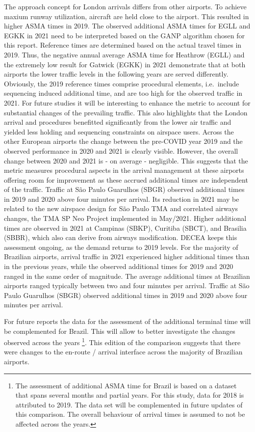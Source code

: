 \documentclass[
  a4paper,
  DIV=11,
  numbers=noendperiod]{scrreprt}
\begin{document}
The approach concept for London arrivals differs from other airports. To
achieve maxium runway utilization, aircraft are held close to the
airport. This resulted in higher ASMA times in 2019. The observed
additional ASMA times for EGLL and EGKK in 2021 need to be interpreted
based on the GANP algorithm chosen for this report. Reference times are
determined based on the actual travel times in 2019. Thus, the negative
annual average ASMA time for Heathrow (EGLL) and the extremely low
result for Gatwick (EGKK) in 2021 demonstrate that at both airports the
lower traffic levels in the following years are served differently.
Obviously, the 2019 reference times comprise procedural elements,
i.e.~include sequencing induced additional time, and are too high for
the observed traffic in 2021. For future studies it will be interesting
to enhance the metric to account for substantial changes of the
prevailing traffic. This also highlights that the London arrival and
procedures benefitted significantly from the lower air traffic and
yielded less holding and sequencing constraints on airspace users.
Across the other European airports the change between the pre-COVID year
2019 and the observed performance in 2020 and 2021 is clearly visible.
However, the overall change between 2020 and 2021 is - on average -
negligible. This suggests that the metric measures procedural aspects in
the arrival management at these airports offering room for improvement
as these accrued additional times are independent of the traffic.
Traffic at São Paulo Guarulhos (SBGR) observed additional times in 2019
and 2020 above four minutes per arrival. Its reduction in 2021 may be
related to the new airspace design for São Paulo TMA and correlated
airways changes, the TMA SP Neo Project implemented in May/2021. Higher
additional times are observed in 2021 at Campinas (SBKP), Curitiba
(SBCT), and Brasilia (SBBR), which also can derive from airways
modification. DECEA keeps this assessment ongoing, as the demand returns
to 2019 levels. For the majority of Brazilian airports, arrival traffic
in 2021 experienced higher additional times than in the previous years,
while the observed additional times for 2019 and 2020 ranged in the same
order of magnitude. The average additional times at Brazilian airports
ranged typically between two and four minutes per arrival. Traffic at
São Paulo Guarulhos (SBGR) observed additional times in 2019 and 2020
above four minutes per arrival.

For future reports the data for the assessment of the additional
terminal time will be complemented for Brazil. This will allow to better
investigate the changes observed across the years \footnote{The
  assessment of additional ASMA time for Brazil is based on a dataset
  that spans several months and partial years. For this study, data for
  2018 is attributed to 2019. The data set will be complemented in
  future updates of this comparison. The overall behaviour of arrival
  times is assumed to not be affected across the years.}. This edition
of the comparison suggests that there were changes to the en-route /
arrival interface across the majority of Brazilian airports.
\end{document}
